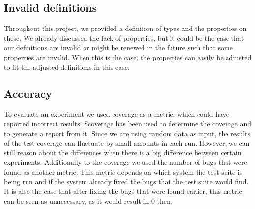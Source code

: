 \subsection*{Invalid definitions}
Throughout this project, we provided a definition of types and the properties on these. We already discussed the lack of properties, but it could be the case that our definitions are invalid or might be renewed in the future such that some properties are invalid. When this is the case, the properties can easily be adjusted to fit the adjusted definitions in this case. 

\subsection*{Accuracy}
To evaluate an experiment we used coverage as a metric, which could have reported incorrect results. Scoverage has been used to determine the coverage and to generate a report from it. Since we are using random data as input, the results of the test coverage can fluctuate by small amounts in each run. However, we can still reason about the differences when there is a big difference between certain experiments. Additionally to the coverage we used the number of bugs that were found as another metric. This metric depends on which system the test suite is being run and if the system already fixed the bugs that the test suite would find. It is also the case that after fixing the bugs that were found earlier, this metric can be seen as unnecessary, as it would result in 0 then.

